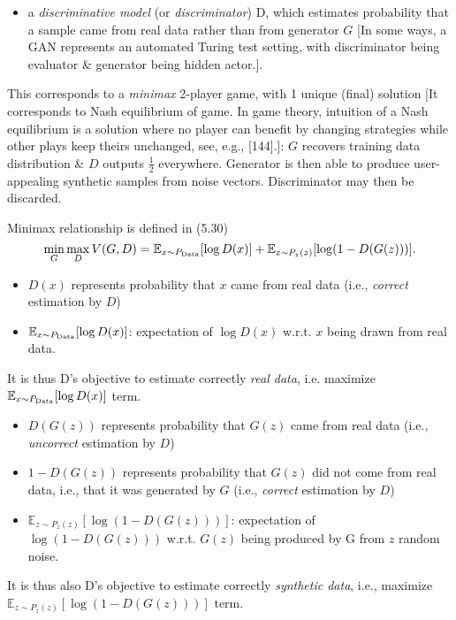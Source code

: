 \documentclass{article}
\begin{document}
\begin{itemize}
\begin{itemize}
\begin{itemize}
			\item a {\it discriminative model} (or {\it discriminator}) D, which estimates probability that a sample came from real data rather than from generator $G$ [In some ways, a GAN represents an automated Turing test setting, with discriminator being evaluator \& generator being hidden actor.].
		\end{itemize}
		This corresponds to a {\it minimax} 2-player game, with 1 unique (final) solution [It corresponds to Nash equilibrium of game. In game theory, intuition of a Nash equilibrium is a solution where no player can benefit by changing strategies while other plays keep theirs unchanged, see, e.g., [144].]: $G$ recovers training data distribution \& $D$ outputs $\frac{1}{2}$ everywhere. Generator is then able to produce user-appealing synthetic samples from noise vectors. Discriminator may then be discarded.
		
		Minimax relationship is defined in (5.30)
		\begin{equation*}
			\min_G\max_D V(G,D) = \mathbb{E}_{x\sim P_{\rm Data}}[\log D(x)] + \mathbb{E}_{z\sim P_z(z)}[\log(1 - D(G(z)))].
		\end{equation*}
		\begin{itemize}
			\item $D(x)$ represents probability that $x$ came from real data (i.e., {\it correct} estimation by $D$)
			\item $\mathbb{E}_{x\sim P_{\rm Data}}[\log D(x)]$: expectation of $\log D(x)$ w.r.t. $x$ being drawn from real data.
		\end{itemize}
		It is thus D's objective to estimate correctly {\it real data}, i.e. maximize $\mathbb{E}_{x\sim P_{\rm Data}}[\log D(x)]$ term.
		\begin{itemize}
			\item $D(G(z))$ represents probability that $G(z)$ came from real data (i.e., {\it uncorrect} estimation by $D$)
			\item $1 - D(G(z))$ represents probability that $G(z)$ did not come from real data, i.e., that it was generated by $G$ (i.e., {\it correct} estimation by $D$)
			\item $\mathbb{E}_{z\sim P_z(z)}[\log(1 - D(G(z)))]$: expectation of $\log(1 - D(G(z)))$ w.r.t. $G(z)$ being produced by G from $z$ random noise.
		\end{itemize}
		It is thus also D's objective to estimate correctly {\it synthetic data}, i.e., maximize $\mathbb{E}_{z\sim P_z(z)}[\log(1 - D(G(z)))]$ term.
		

\end{itemize}
\end{itemize}
\end{document}
